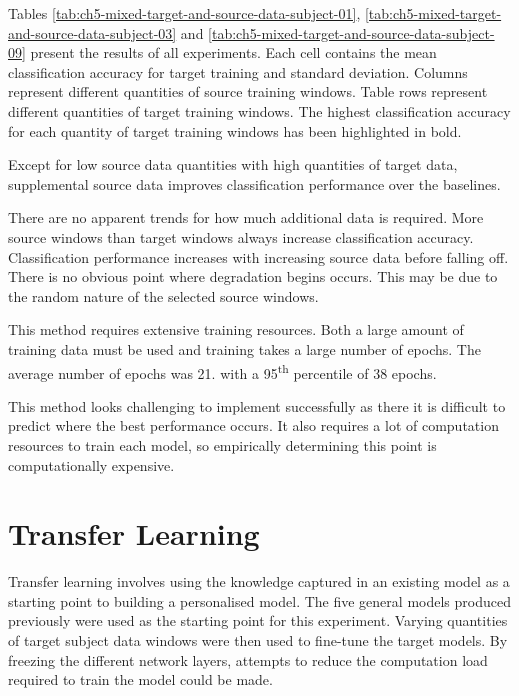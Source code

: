 Tables \ref{tab:ch5-mixed-target-and-source-data-subject-01}, \ref{tab:ch5-mixed-target-and-source-data-subject-03} and \ref{tab:ch5-mixed-target-and-source-data-subject-09} present the results of all experiments. Each cell contains the mean classification accuracy for target training and standard deviation. Columns represent different quantities of source training windows. Table rows represent different quantities of target training windows. The highest classification accuracy for each quantity of target training windows has been highlighted in bold.



Except for low source data quantities with high quantities of target data, supplemental source data improves classification performance over the baselines. 

There are no apparent trends for how much additional data is required. More source windows than target windows always increase classification accuracy. Classification performance increases with increasing source data before falling off. There is no obvious point where degradation begins occurs. This may be due to the random nature of the selected source windows.

This method requires extensive training resources. Both a large amount of training data must be used and training takes a large number of epochs. The average number of epochs was 21. with a 95\textsuperscript{th} percentile of 38 epochs.

This method looks challenging to implement successfully as there it is difficult to predict where the best performance occurs. It also requires a lot of computation resources to train each model, so empirically determining this point is computationally expensive.

\section{Transfer Learning}
\label{sec:model-personalisation-results-transfer}
Transfer learning involves using the knowledge captured in an existing model as a starting point to building a personalised model. The five general models produced previously were used as the starting point for this experiment. Varying quantities of target subject data windows were then used to fine-tune the target models. By freezing the different network layers, attempts to reduce the computation load required to train the model could be made.


